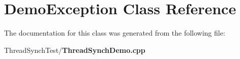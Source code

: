 \section{Demo\-Exception Class Reference}
\label{class_demo_exception}


The documentation for this class was generated from the following file:\begin{CompactItemize}
\item 
Thread\-Synch\-Test/{\bf Thread\-Synch\-Demo.cpp}\end{CompactItemize}
